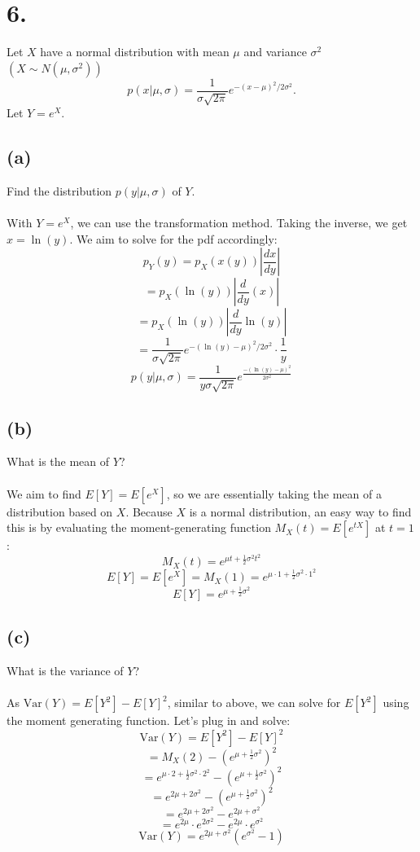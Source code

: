 \documentclass{article}
\begin{document}
{\Large 

\section*{6.}
Let \(X\) have a normal distribution with mean \(\mu\) and variance \(\sigma^2 \) \((X \sim N(\mu, \sigma^2))\)
\[
  p(x | \mu, \sigma) = \frac{1}{\sigma \sqrt{2\pi}} e^{-(x - \mu)^2 / 2 \sigma^2}.
\]
Let \(Y = e^X\).

\subsection*{(a)} 
Find the distribution \(p(y | \mu, \sigma)\) of \(Y\). \\ \\
With \(Y = e^X\), we can use the transformation method. Taking the inverse, we get \(x = \ln(y)\). We aim to solve for the pdf accordingly:
\[
  p_Y(y) = p_X(x(y)) | \frac{dx}{dy} |
\]
\[
  = p_X(\ln(y)) | \frac{d}{dy} (x) |
\]
\[
  = p_X(\ln(y)) | \frac{d}{dy} \ln(y) |
\]
\[
  = \frac{1}{\sigma \sqrt{2\pi}} e^{-(\ln(y) - \mu)^2 / 2 \sigma^2} \cdot \frac{1}{y}
\]
\[
  \boxed{p(y | \mu, \sigma) = \frac{1}{y \sigma \sqrt{2\pi}} e^\frac{-(\ln(y) - \mu)^2}{2 \sigma^2}}
\]

\subsection*{(b)}
What is the mean of \(Y\)? \\ \\
We aim to find \(E[Y] = E[e^X]\), so we are essentially taking the mean of a distribution based on \(X\). Because \(X\) is a normal distribution, an easy way to find this is by evaluating the moment-generating function \(M_X(t) = E[e^{tX}]\) at \(t=1\):
\[
  M_X(t) = e^{\mu t + \frac{1}{2} \sigma^2 t^2}
\]
\[
  E[Y] = E[e^X] = M_X(1) = e^{\mu \cdot 1 + \frac{1}{2} \sigma^2 \cdot 1^2}
\]
\[
  \boxed{E[Y] = e^{\mu + \frac{1}{2} \sigma^2}}
\]

\subsection*{(c)}
What is the variance of \(Y\)? \\ \\
As \(\text{Var}(Y) = E[Y^2] - E[Y]^2\), similar to above, we can solve for \(E[Y^2]\) using the moment generating function. Let's plug in and solve:
\[
  \text{Var}(Y) = E[Y^2] - E[Y]^2
\]
\[
  = M_X(2) - (e^{\mu + \frac{1}{2} \sigma^2})^2
\]
\[
  = e^{\mu \cdot 2 + \frac{1}{2} \sigma^2 \cdot 2^2} - (e^{\mu + \frac{1}{2} \sigma^2})^2
\]
\[
  = e^{2 \mu + 2 \sigma^2} - (e^{\mu + \frac{1}{2} \sigma^2})^2
\]
\[
  = e^{2 \mu + 2 \sigma^2} - e^{2\mu + \sigma^2}
\]
\[
  = e^{2 \mu} \cdot e^{2 \sigma^2} - e^{2\mu} \cdot e^{\sigma^2}
\]
\[
  \boxed{\text{Var}(Y) = e^{2\mu + \sigma^2} ( e^{\sigma^2} - 1)}
\]

}
\end{document}
